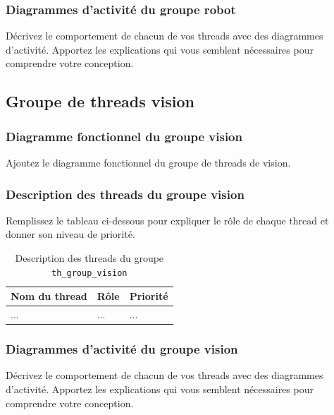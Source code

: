 \documentclass[11pt, a4paper]{paper}
\begin{document}
\subsubsection{Diagrammes d'activité du groupe robot}
{\color{blue}Décrivez le comportement de chacun de vos threads avec des diagrammes d'activité. Apportez les explications qui vous semblent nécessaires pour comprendre votre conception.}

\subsection{Groupe de threads vision}

\subsubsection{Diagramme fonctionnel du groupe vision}

{\color{blue} Ajoutez le diagramme fonctionnel du groupe de threads de vision.}

\subsubsection{Description des threads du groupe vision}
{\color{red} Remplissez le tableau ci-dessous pour expliquer le rôle de chaque thread et donner son niveau de priorité.}


\begin{table}[htp]
\caption{Description des threads du groupe {\tt th\_group\_vision}}
\begin{center}
\begin{tabular}{|p{3cm}|p{8.5cm}|p{2cm}|}
\hline
\bf Nom du thread &	\bf Rôle &	\bf Priorité \\
\hline
\hline
\color{blue}... &	\color{blue}... &	\color{blue}...\\
\hline
\end{tabular}
\end{center}
\label{tab:gt_moniteur}
\end{table}%
\FloatBarrier

\subsubsection{Diagrammes d'activité du groupe vision}
{\color{blue}Décrivez le comportement de chacun de vos threads avec des diagrammes d'activité. Apportez les explications qui vous semblent nécessaires pour comprendre votre conception.}
\end{document}
